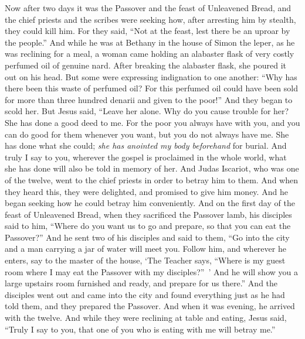 \begin{biblechapter} %
 Now after two days it was the Passover and the feast of Unleavened Bread, and the chief priests and the scribes were seeking how, after arresting him by stealth, they could kill him.
\verse For they said, “Not at the feast, lest there be an uproar by the people.”
 And while he was at Bethany in the house of Simon the leper, as he was reclining for a meal, a woman came holding an alabaster flask of very costly perfumed oil of genuine nard. After breaking the alabaster flask, she poured it out on his head.
\verse But some were expressing indignation to one another: “Why has there been this waste of perfumed oil?
\verse For this perfumed oil could have been sold for more than three hundred denarii and given to the poor!” And they began to scold her.
\verse But Jesus said, “Leave her alone. Why do you cause trouble for her? She has done a good deed to me.
\verse For the poor you always have with you, and you can do good for them whenever you want, but you do not always have me.
\verse She has done what she could; \textit{she has anointed my body beforehand} for burial.
\verse And truly I say to you, wherever the gospel is proclaimed in the whole world, what she has done will also be told in memory of her.
 And Judas Iscariot, who was one of the twelve, went to the chief priests in order to betray him to them.
\verse And when they heard this, they were delighted, and promised to give him money. And he began seeking how he could betray him conveniently.
 And on the first day of the feast of Unleavened Bread, when they sacrificed the Passover lamb, his disciples said to him, “Where do you want us to go and prepare, so that you can eat the Passover?”
\verse And he sent two of his disciples and said to them, “Go into the city and a man carrying a jar of water will meet you. Follow him,
\verse and wherever he enters, say to the master of the house, ‘The Teacher says, “Where is my guest room where I may eat the Passover with my disciples?” ’
\verse And he will show you a large upstairs room furnished and ready, and prepare for us there.”
\verse And the disciples went out and came into the city and found everything just as he had told them, and they prepared the Passover.
\verse And when it was evening, he arrived with the twelve.
\verse And while they were reclining at table and eating, Jesus said, “Truly I say to you, that one of you who is eating with me will betray me.”

\end{biblechapter}
